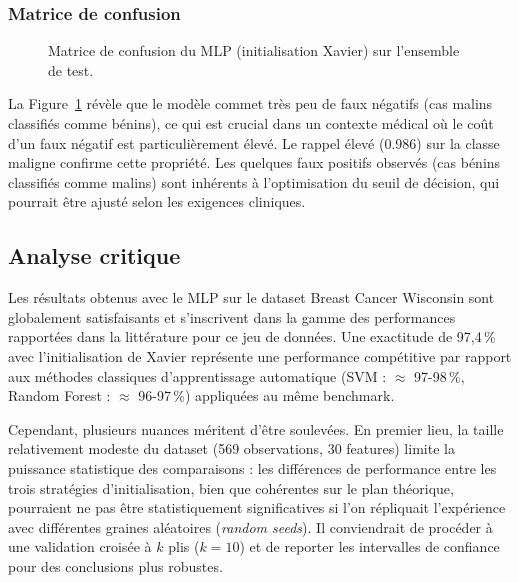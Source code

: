 \documentclass[11pt,a4paper]{article}
\begin{document}
\subsubsection{Matrice de confusion}

\begin{figure}[H]
  \centering
  \caption{Matrice de confusion du MLP (initialisation Xavier) sur l'ensemble de test.}
  \label{fig:mlp_confusion}
\end{figure}

La Figure~\ref{fig:mlp_confusion} révèle que le modèle commet très peu de faux négatifs
(cas malins classifiés comme bénins), ce qui est crucial dans un contexte médical où le
coût d'un faux négatif est particulièrement élevé. Le rappel élevé (0.986) sur la classe
maligne confirme cette propriété. Les quelques faux positifs observés (cas bénins
classifiés comme malins) sont inhérents à l'optimisation du seuil de décision, qui
pourrait être ajusté selon les exigences cliniques.

\subsection{Analyse critique}

Les résultats obtenus avec le MLP sur le dataset Breast Cancer Wisconsin sont
globalement satisfaisants et s'inscrivent dans la gamme des performances rapportées
dans la littérature pour ce jeu de données. Une exactitude de 97,4\,\% avec
l'initialisation de Xavier représente une performance compétitive par rapport aux
méthodes classiques d'apprentissage automatique (SVM : $\approx$ 97-98\,\%, Random
Forest : $\approx$ 96-97\,\%) appliquées au même benchmark.

Cependant, plusieurs nuances méritent d'être soulevées. En premier lieu, la taille
relativement modeste du dataset (569 observations, 30 features) limite la puissance
statistique des comparaisons : les différences de performance entre les trois stratégies
d'initialisation, bien que cohérentes sur le plan théorique, pourraient ne pas être
statistiquement significatives si l'on répliquait l'expérience avec différentes graines
aléatoires (\textit{random seeds}). Il conviendrait de procéder à une validation croisée
à $k$ plis ($k = 10$) et de reporter les intervalles de confiance pour des conclusions
plus robustes.
\end{document}
